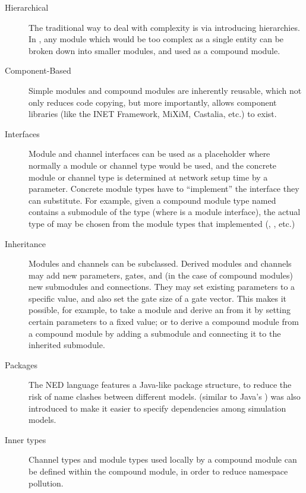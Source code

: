 \begin{description}

\item[Hierarchical] The traditional way to deal with complexity is via
introducing hierarchies. In \opp, any module which would be too complex as
a single entity can be broken down into smaller modules, and used as a
compound module.

\item[Component-Based] Simple modules and compound modules are inherently
reusable, which not only reduces code copying, but more importantly, allows
component libraries (like the INET Framework, MiXiM, Castalia, etc.) to
exist.

\item[Interfaces] Module and channel interfaces can be used as a
placeholder where normally a module or channel type would be used, and the
concrete module or channel type is determined at network setup time by a
parameter. Concrete module types have to ``implement'' the interface they
can substitute. For example, given a compound module type named
 contains a  submodule of the type
 (where  is a module interface), the actual
type of  may be chosen from the module types that implemented
 (, , etc.)

\item[Inheritance] Modules and channels can be subclassed. Derived modules
and channels may add new parameters, gates, and (in the case of compound
modules) new submodules and connections. They may set existing parameters
to a specific value, and also set the gate size of a gate vector. This
makes it possible, for example, to take a  module
and derive an  from it by setting certain parameters to a fixed
value; or to derive a  compound module from a
 compound module by adding a  submodule and
connecting it to the inherited  submodule.

\item[Packages] The NED language features a Java-like package structure,
to reduce the risk of name clashes between different models. 
(similar to Java's ) was also introduced to make it easier
to specify dependencies among simulation models.

\item[Inner types] Channel types and module types used locally by a
compound module can be defined within the compound module, in order to
reduce namespace pollution.


\end{description}
